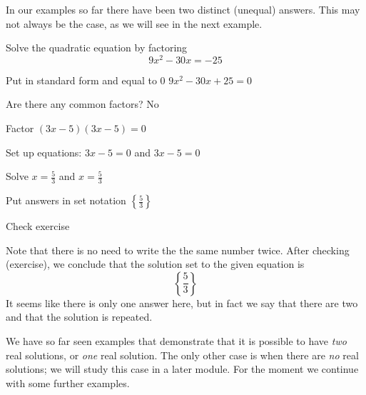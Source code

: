 In our examples so far there have been two distinct (unequal) answers. This may not always be the case, 
as we will see in the next example. 

\begin{myexample}
Solve the quadratic equation by factoring
\[
	9x^2-30x = -25
\]
\end{myexample}
\begin{myProof}
	\begin{steps}
		\item Put in standard form and equal to 0 \hfill $9x^2-30x+25 = 0$                     
		\item	Are there any common factors?       \hfill No                                
		\item	Factor                              \hfill $(3x-5)(3x-5)=0$                      
		\item	Set up equations:                   \hfill $3x-5=0$  and  $3x-5=0$               
		\item	Solve                               \hfill $x=\frac{5}{3}$  and  $x=\frac{5}{3}$ 
		\item	Put answers in set notation         \hfill $\left\{\frac{5}{3}\right\}$
		\item Check \hfill exercise
	\end{steps}
	Note that there is no need to write the the same number twice. After checking (exercise), we conclude that
	the solution set to the given equation is
	\[
		\left\{\frac{5}{3}\right\}
	\]
	It seems like there is only one answer here, but in fact we say that there are two and that the solution is
	repeated. 
\end{myProof}

We have so far seen examples that demonstrate that it is possible to have {\em two} real solutions, or {\em one} real
solution. The only other case is when there are {\em no} real solutions; we will study this case in a later module. For
the moment we continue with some further examples. 


